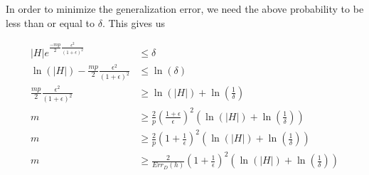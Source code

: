 \begin{enumerate}
In order to minimize the generalization error, we need the above probability to be less than or equal to $\delta$. This gives us

\begin{equation*}
\begin{aligned}
\left | H \right | e^ {\frac{-mp}{2} \frac{\epsilon^2}{(1+\epsilon)^2}} &\leq \delta\\
\ln(\left | H \right | ) - \frac{mp}{2} \frac{\epsilon^2}{(1+\epsilon)^2}&\leq \ln(\delta)\\
\frac{mp}{2} \frac{\epsilon^2}{(1+\epsilon)^2} &\geq \ln(\left | H \right | ) + \ln\left(\frac{1}{\delta}\right)\\
m &\geq \frac{2}{p} \left(\frac{1+\epsilon}{\epsilon}\right)^2 \left(\ln(\left | H \right | ) + \ln \left ( \frac{1}{\delta} \right )\right)\\
m &\geq \frac{2}{p} \left(1+\frac{1}{\epsilon}\right)^2 \left(\ln(\left | H \right | ) + \ln \left ( \frac{1}{\delta} \right )\right)\\
m &\geq \frac{2}{Err_D(h)} \left(1+\frac{1}{\epsilon}\right)^2 \left(\ln(\left | H \right | ) + \ln \left ( \frac{1}{\delta} \right )\right)
\end{aligned}
\end{equation*}

\end{enumerate}

